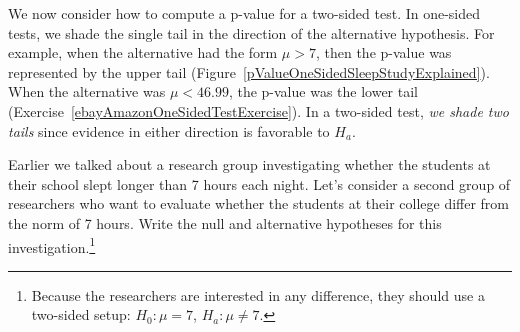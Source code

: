 
We now consider how to compute a p-value for a two-sided test. In one-sided tests, we shade the single tail in the direction of the alternative hypothesis. For example, when the alternative had the form $\mu > 7$, then the p-value was represented by the upper tail (Figure~\ref{pValueOneSidedSleepStudyExplained}). When the alternative was $\mu < 46.99$, the p-value was the lower tail (Exercise~\ref{ebayAmazonOneSidedTestExercise}). In a two-sided test, \emph{we shade two tails} since evidence in either direction is favorable to $H_a$.

\begin{exercise} \label{2ndSchSleepHypSetupExercise}
Earlier we talked about a research group investigating whether the students at their school slept longer than 7 hours each night. Let's consider a second group of researchers who want to evaluate whether the students at their college differ from the norm of 7 hours. Write the null and alternative hypotheses for this investigation.\footnote{Because the researchers are interested in any difference, they should use a two-sided setup: $H_0: \mu = 7$, $H_a: \mu \neq 7$.}
\end{exercise}

